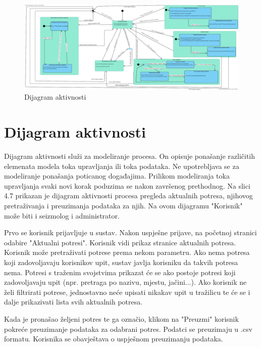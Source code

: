 			
			
		\begin{figure}[H]
			\includegraphics[width=\textwidth]{slike/dijagramstanja.png}
			\caption{Dijagram aktivnosti}
			\label{fig:uml_db} 
		\end{figure}
			
			\eject 
		
		\section{Dijagram aktivnosti}
		
		Dijagram aktivnosti služi za modeliranje procesa. On opisuje ponašanje različitih elemenata modela toka upravljanja ili toka podataka. Ne upotrebljava se za modeliranje ponašanja poticanog događajima. Prilikom modeliranja toka upravljanja svaki novi korak poduzima se nakon završenog
		prethodnog. Na slici 4.7 prikazan je dijagram aktivnosti procesa pregleda aktualnih potresa, njihovog pretraživanja i preuzimanja podataka za njih. 
		Na ovom dijagramu "Korisnik" može biti i seizmolog i administrator.
		
		Prvo se korisnik prijavljuje u sustav. Nakon uspješne prijave, na početnoj stranici odabire "Aktualni potresi". Korisnik vidi prikaz stranice aktualnih potresa. Korisnik može pretraživati potrese prema nekom parametru. Ako nema potresa koji zadovoljavaju korisnikov upit, sustav javlja korisniku da takvih potresa nema. Potresi s traženim svojstvima prikazat će se ako postoje potresi koji zadovoljavaju upit (npr. pretraga po nazivu, mjestu, jačini...). Ako korisnik ne želi filtrirati potrese, jednostavno neće upisati nikakav upit u tražilicu te će se i dalje prikazivati lista svih aktualnih potresa.
		
		Kada je pronašao željeni potres te ga označio, klikom na "Preuzmi" korisnik pokreće preuzimanje podataka za odabrani potres. Podatci se preuzimaju u .csv formatu. Korisnika se obavještava o uspješnom preuzimanju podataka.
		
